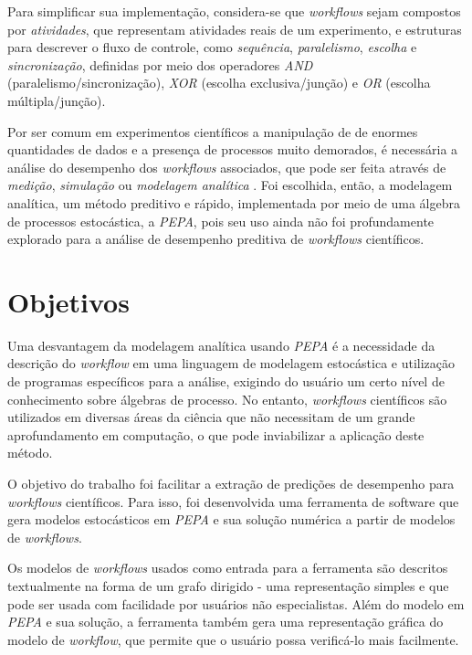 \documentclass[a4paper,11pt]{article}
\begin{document}
    Para simplificar sua implementação, considera-se que \emph{workflows} sejam compostos por \emph{atividades}, que representam atividades reais de um experimento, e estruturas para descrever o fluxo de controle, como \emph{sequência}, \emph{paralelismo}, \emph{escolha} e \emph{sincronização}, definidas por meio dos operadores \emph{AND} (paralelismo/sincronização), \emph{XOR} (escolha exclusiva/junção) e \emph{OR} (escolha múltipla/junção).

        Por ser comum em experimentos científicos a manipulação de de enormes quantidades de dados e a presença de processos muito demorados, é necessária a análise do desempenho dos \emph{workflows} associados, que pode ser feita através de \emph{medição}, \emph{simulação} ou \emph{modelagem analítica} \cite{phd:kelly11}. Foi escolhida, então, a modelagem analítica, um método preditivo e rápido, implementada por meio de uma álgebra de processos estocástica, a \emph{PEPA}, pois seu uso ainda não foi profundamente explorado para a análise de desempenho preditiva de \emph{workflows} científicos.

    \section*{Objetivos}

        Uma desvantagem da modelagem analítica usando \emph{PEPA} é a necessidade da descrição do \emph{workflow} em uma linguagem de modelagem estocástica e utilização de programas específicos para a análise, exigindo do usuário um certo nível de conhecimento sobre álgebras de processo. No entanto, \emph{workflows} científicos são utilizados em diversas áreas da ciência que não necessitam de um grande aprofundamento em computação, o que pode inviabilizar a aplicação deste método.

        O objetivo do trabalho foi facilitar a extração de predições de desempenho para \emph{workflows} científicos. Para isso, foi desenvolvida uma ferramenta de software que gera modelos estocásticos em \emph{PEPA} e sua solução numérica a partir de modelos de \emph{workflows}.

        Os modelos de \emph{workflows} usados como entrada para a ferramenta são descritos textualmente na forma de um grafo dirigido - uma representação simples e que pode ser usada com facilidade por usuários não especialistas. Além do modelo em \emph{PEPA} e sua solução, a ferramenta também gera uma representação gráfica do modelo de \emph{workflow}, que permite que o usuário possa verificá-lo mais facilmente.
\end{document}

